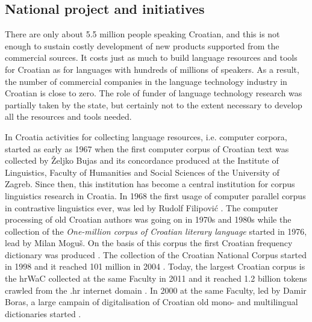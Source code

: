 \begin{multicols}{2}
\subsection{National project and initiatives}

There are only about 5.5 million people speaking Croatian, and this is not enough to sustain costly development of new products supported from the commercial sources. It costs just as much to build language resources and tools for Croatian as for languages with hundreds of millions of speakers. As a result, the number of commercial companies in the language technology industry in Croatian is close to zero. The role of funder of language technology research was partially taken by the state, but certainly not to the extent necessary to develop all the resources and tools needed.


In Croatia activities for collecting language resources, i.e. computer corpora, started as early as 1967 when the first computer corpus of Croatian text was collected by Željko Bujas and its concordance produced \cite{boo3} at the Institute of Linguistics, Faculty of Humanities and Social Sciences of the University of Zagreb. Since then, this institution has become a central institution for corpus linguistics research in Croatia. In 1968 the first usage of computer parallel corpus in contrastive linguistics ever, was led by Rudolf Filipović \cite{art7}. The computer processing of old Croatian authors was going on in 1970s and 1980s while the collection of the \emph{One-million corpus of Croatian literary language} started in 1976, lead by Milan Moguš. On the basis of this corpus the first Croatian frequency dictionary was produced \cite{boo4}. The collection of the Croatian National Corpus \cite{str27} started in 1998 \cite{pro8, boo5} and it reached 101 million in 2004 \cite{pro9}. Today, the largest Croatian corpus is the hrWaC collected at the same Faculty in 2011 and it reached 1.2 billion tokens crawled from the .hr internet domain \cite{pro10}. In 2000 at the same Faculty, led by Damir Boras, a large campain of digitalisation of Croatian old mono- and multilingual dictionaries started \cite{str28}. 



\end{multicols}
